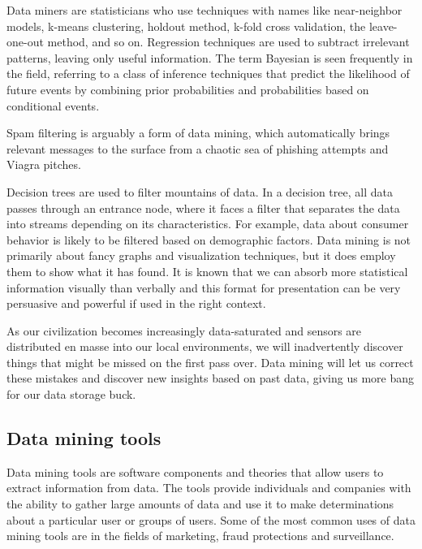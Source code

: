 \documentclass[11pt]{article} %
\begin{document}
Data miners are statisticians who use techniques with names like near-neighbor models, k-means clustering, holdout method, k-fold cross validation, the leave-one-out method, and so on. Regression techniques are used to subtract irrelevant patterns, leaving only useful information. The term Bayesian is seen frequently in the field, referring to a class of inference techniques that predict the likelihood of future events by combining prior probabilities and probabilities based on conditional events.



Spam filtering is arguably a form of data mining, which automatically brings relevant messages to the surface from a chaotic sea of phishing attempts and Viagra pitches.



Decision trees are used to filter mountains of data. In a decision tree, all data passes through an entrance node, where it faces a filter that separates the data into streams depending on its characteristics. For example, data about consumer behavior is likely to be filtered based on demographic factors. Data mining is not primarily about fancy graphs and visualization techniques, but it does employ them to show what it has found. It is known that we can absorb more statistical information visually than verbally and this format for presentation can be very persuasive and powerful if used in the right context.



As our civilization becomes increasingly data-saturated and sensors are distributed en masse into our local environments, we will inadvertently discover things that might be missed on the first pass over. Data mining will let us correct these mistakes and discover new insights based on past data, giving us more bang for our data storage buck.

\subsection{Data mining tools}

Data mining tools are software components and theories that allow users to extract information from data. The tools provide individuals and companies with the ability to gather large amounts of data and use it to make determinations about a particular user or groups of users. Some of the most common uses of data mining tools are in the fields of marketing, fraud protections and surveillance.
\end{document}
